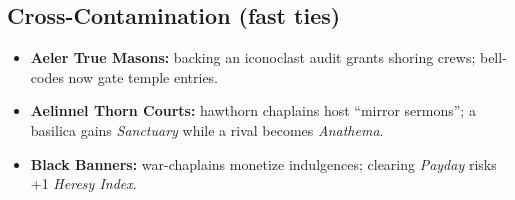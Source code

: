 \subsection*{Cross-Contamination (fast ties)}
\begin{itemize}
  \item \textbf{Aeler True Masons:} backing an iconoclast audit grants shoring crews; bell-codes now gate temple entries.
  \item \textbf{Aelinnel Thorn Courts:} hawthorn chaplains host ``mirror sermons''; a basilica gains \emph{Sanctuary} while a rival becomes \emph{Anathema}.
  \item \textbf{Black Banners:} war-chaplains monetize indulgences; clearing \emph{Payday} risks +1 \emph{Heresy Index}.
\end{itemize}